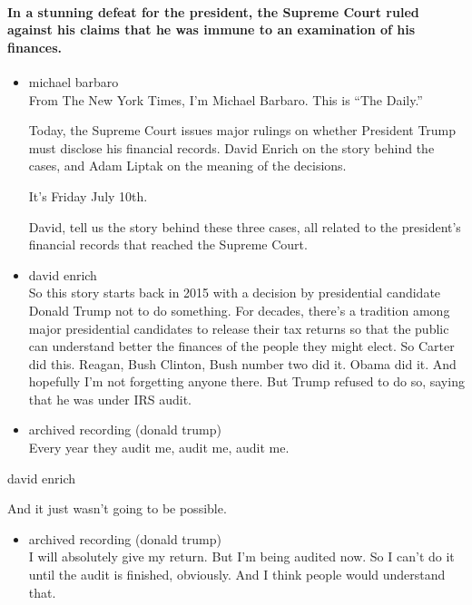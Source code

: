 \hypertarget{in-a-stunning-defeat-for-the-president-the-supreme-court-ruled-against-his-claims-that-he-was-immune-to-an-examination-of-his-finances}{%
\paragraph{In a stunning defeat for the president, the Supreme Court
ruled against his claims that he was immune to an examination of his
finances.}\label{in-a-stunning-defeat-for-the-president-the-supreme-court-ruled-against-his-claims-that-he-was-immune-to-an-examination-of-his-finances}}

\begin{itemize}
\item
  michael barbaro\\
  From The New York Times, I'm Michael Barbaro. This is ``The Daily.''

  Today, the Supreme Court issues major rulings on whether President
  Trump must disclose his financial records. David Enrich on the story
  behind the cases, and Adam Liptak on the meaning of the decisions.

  It's Friday July 10th.

  David, tell us the story behind these three cases, all related to the
  president's financial records that reached the Supreme Court.
\item
  david enrich\\
  So this story starts back in 2015 with a decision by presidential
  candidate Donald Trump not to do something. For decades, there's a
  tradition among major presidential candidates to release their tax
  returns so that the public can understand better the finances of the
  people they might elect. So Carter did this. Reagan, Bush Clinton,
  Bush number two did it. Obama did it. And hopefully I'm not forgetting
  anyone there. But Trump refused to do so, saying that he was under IRS
  audit.
\item
  archived recording (donald trump)\\
  Every year they audit me, audit me, audit me.
\end{itemize}

david enrich

And it just wasn't going to be possible.

\begin{itemize}
\tightlist
\item
  archived recording (donald trump)\\
  I will absolutely give my return. But I'm being audited now. So I
  can't do it until the audit is finished, obviously. And I think people
  would understand that.
\end{itemize}

